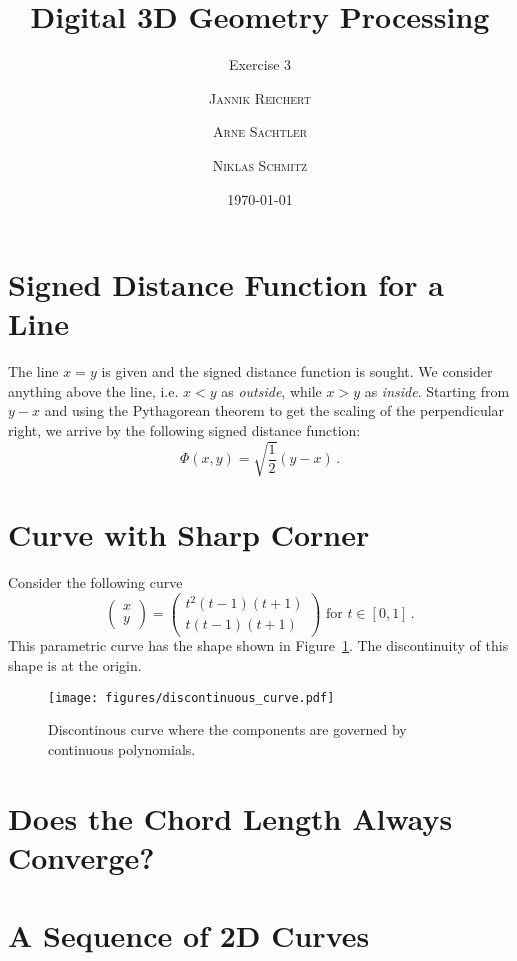 \documentclass{scrartcl}
\title{Digital 3D Geometry Processing}
\subtitle{Exercise 3}
\author{\textsc{Jannik Reichert} \and \textsc{Arne Sachtler} \and \textsc{Niklas Schmitz}}
\date{\today}
\begin{document}
\maketitle

\section{Signed Distance Function for a Line}
The line $x = y$ is given and the signed distance function is sought.
We consider anything above the line, i.e. $x < y$ as \emph{outside},
while $x > y$ as \emph{inside}. Starting from $y - x$ and using the Pythagorean theorem
to get the scaling of the perpendicular right, we arrive by the following signed distance function:
\begin{equation}
	\Phi (x,y) = \sqrt{\frac{1}{2}} (y - x) \, .
\end{equation}

\section{Curve with Sharp Corner}

Consider the following curve
\begin{equation}
	\begin{pmatrix}x\\y\end{pmatrix} = \begin{pmatrix}t^2 (t-1) (t+1)\\t (t-1) (t+1)\end{pmatrix} \text{ for } t \in [0, 1]\, .
\end{equation}
This parametric curve has the shape shown in Figure~\ref{fig:disc}. The discontinuity of this shape is at the origin.
\begin{figure}[h]
	\centering
	\texttt{[image: figures/discontinuous\_curve.pdf]}
	\caption{Discontinous curve where the components are governed by continuous polynomials.}
	\label{fig:disc}
\end{figure}



\section{Does the Chord Length Always Converge?}

\section{A Sequence of 2D Curves}
	
\end{document}
